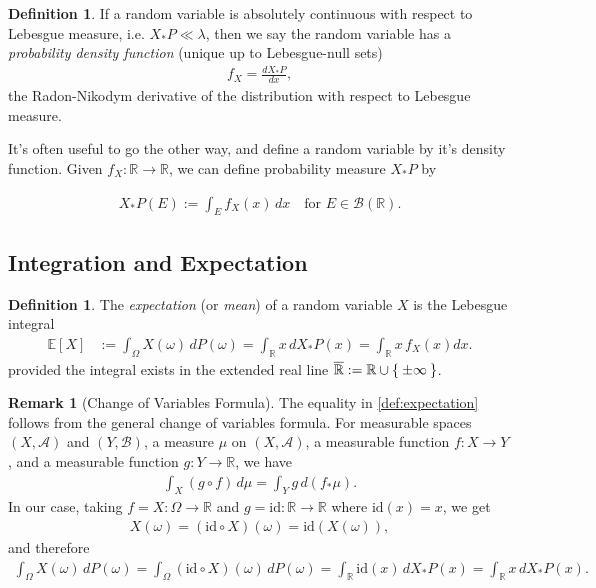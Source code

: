 \documentclass[11pt,reqno]{amsart}
\theoremstyle{definition}
\newtheorem{definition}[theorem]{Definition}
\newtheorem{remark}[theorem]{Remark}
\theoremstyle{remark}
\begin{document}
\begin{definition}
	If a random variable is absolutely continuous with respect to Lebesgue measure, i.e. \(X_{*}P \ll \lambda\), then we say the random variable has a \emph{probability density function} (unique up to Lebesgue-null sets)
	\begin{align*}
		f_X = \frac{d X_{*}P}{dx},
	\end{align*}
	the Radon-Nikodym derivative of the distribution with respect to Lebesgue measure.
\end{definition}

It's often useful to go the other way, and define a random variable by it's density function. Given \(f_X: \mathbb{R} \rightarrow \mathbb{R}\), we can define probability measure \(X_{*}P\) by

\begin{align*}
	X_{*}P (E) := \int_E f_X(x) \, dx \quad \text{for } E \in \mathcal{B}(\mathbb{R}).
\end{align*}

\subsection{Integration and Expectation}

\begin{definition}
	The \emph{expectation} (or \emph{mean}) of a random variable $X$ is the Lebesgue integral
	\begin{align} \label{def:expectation}
		\mathbb{E}[X]
		 & := \int_\Omega X(\omega) \, dP(\omega)
		= \int_{\mathbb{R}} x \, dX_*P(x)
		= \int_{\mathbb{R}} x \, f_X(x) dx.
	\end{align}
	provided the integral exists in the extended real line $\overline{\mathbb{R}} := \mathbb{R} \cup \Set{\pm \infty}$.
\end{definition}

\begin{remark}[Change of Variables Formula]
	The equality in \eqref{def:expectation} follows from the general change of variables formula. For measurable spaces $(X, \mathcal{A})$ and $(Y, \mathcal{B})$, a measure $\mu$ on $(X, \mathcal{A})$, a measurable function $f: X \to Y$, and a measurable function $g: Y \to \mathbb{R}$, we have
	\begin{align*}
		\int_X (g \circ f) \, d\mu = \int_Y g \, d(f_*\mu).
	\end{align*}
	In our case, taking $f = X: \Omega \to \mathbb{R}$ and $g = \text{id}: \mathbb{R} \to \mathbb{R}$ where $\text{id}(x) = x$, we get
	\begin{align*}
		X(\omega) = (\text{id} \circ X)(\omega) = \text{id}(X(\omega)),
	\end{align*}
	and therefore
	\begin{align} \label{eq:change-of-variables}
		\int_\Omega X(\omega) \, dP(\omega)
		= \int_\Omega (\text{id} \circ X)(\omega) \, dP(\omega)
		= \int_{\mathbb{R}} \text{id}(x) \, dX_*P(x)
		= \int_{\mathbb{R}} x \, dX_*P(x).
	\end{align}
\end{remark}
\end{document}
